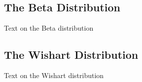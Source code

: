 \documentclass[12pt]{article}
\begin{document}
\pagebreak
\subsection{The Beta Distribution}
Text on the Beta distribution


\pagebreak
\subsection{The Wishart Distribution}
Text on the Wishart distribution

\pagebreak
\end{document}
